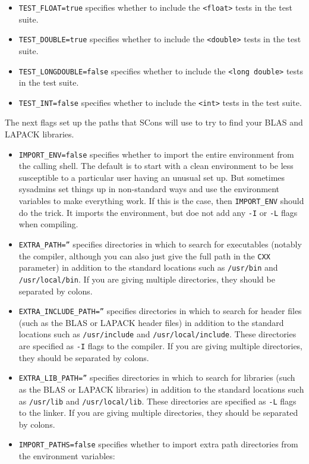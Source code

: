 \documentclass[twoside,letterpaper,11pt]{article}
\renewcommand{\tt}[1]{{\lstinline {#1}}}
\begin{document}
\begin{enumerate}
\begin{itemize}
\item \texttt{TEST\_FLOAT=true} specifies whether to include the \tt{<float>} tests in the test suite.
\item \texttt{TEST\_DOUBLE=true} specifies whether to include the \tt{<double>} tests in the test suite.
\item \texttt{TEST\_LONGDOUBLE=false} specifies whether to include the \tt{<long double>} tests in the test suite.
\item \texttt{TEST\_INT=false} specifies whether to include the \tt{<int>} tests in the test suite.
\end{itemize}
The next flags set up the paths that SCons will use to try to find your BLAS and LAPACK libraries.
\begin{itemize}
\item \texttt{IMPORT\_ENV=false} specifies whether to import the entire environment from the calling shell.
The default
is to start with a clean environment to be less susceptible to a particular user having an unusual set up.  But sometimes sysadmins set things up in non-standard ways and use
the environment variables to make everything work.  If this is the case, then 
\texttt{IMPORT\_ENV} should do the trick.  It imports the environment, but doe not add any
\texttt{-I} or \texttt{-L} flags when compiling.
\item \texttt{EXTRA\_PATH=''} specifies directories in which to search for executables (notably the compiler, although you can also just give the full path in the \texttt{CXX} parameter)
in addition to the standard locations such as \texttt{/usr/bin} and \texttt{/usr/local/bin}.
If you are giving multiple directories, they should be separated by colons.
\item \texttt{EXTRA\_INCLUDE\_PATH=''} specifies directories in which to search for header files
(such as the BLAS or LAPACK header files)
in addition to the standard locations such as \texttt{/usr/include} and \texttt{/usr/local/include}.
These directories are specified as \texttt{-I} flags to the compiler.
If you are giving multiple directories, they should be separated by colons.
\item \texttt{EXTRA\_LIB\_PATH=''} specifies directories in which to search for libraries
(such as the BLAS or LAPACK libraries)
in addition to the standard locations such as \texttt{/usr/lib} and \texttt{/usr/local/lib}.  
These directories are specified as \texttt{-L} flags to the linker.
If you are giving multiple directories, they should be separated by colons.
\item \texttt{IMPORT\_PATHS=false} specifies whether to import extra path directories from the environment variables: 

\end{itemize}
\end{enumerate}
\end{document}
